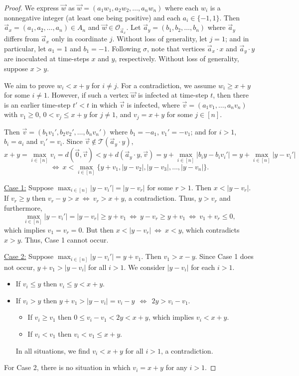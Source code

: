 \documentclass[unknownkeysallowed]{article}
\theoremstyle{definition}\newtheorem{strategy}{Strategy}
\theoremstyle{definition}\newtheorem{notation}{Notation}[theorem]
\begin{document}
\begin{proof} We express $\vec{w}$ 
as $\vec{w} = (a_1w_1,a_2w_2,\dots,a_nw_n)$ where each $w_i$ is a nonnegative integer (at least one being positive) and each $a_i \in \{-1,1\}$.  Then $\vec{a}_x = (a_1,a_2,\dots,a_n) \in A_n$ and 
$\vec{w} \in \mathcal{O}_{\vec{a}_x}$.  Let $\vec{a}_y=(b_1,b_2,\dots,b_n)$ where $\vec{a}_y$ differs from $\vec{a}_x$ only in coordinate $j$.  Without loss of generality, let $j=1$; and in particular, let $a_1=1$ and $b_1=-1$.  Following $\sigma$, note that vertices $\vec{a}_x \cdot x$ and $\vec{a}_y \cdot y$ are inoculated at time-steps $x$ and $y$, respectively.  Without loss of generality, suppose $x > y$.


We aim to prove $w_i < x+y$ for $i \neq j$.  For a contradiction, we  assume $w_i \geq x+y$ for some $i \neq 1$. However, if such a vertex $\vec{w}$ is infected at time-step $t$, then there is an earlier time-step $t'<t$ in which $\vec{v}$ is infected, where $\vec{v}=(a_1v_1,\dots,a_nv_n)$ with $v_1\geq 0$, $0<v_j \leq x+y$ for $j \neq 1$, and $v_j=x+y$ for some $j \in [n]$.
  
Then $\vec{v}= (b_1v_1',b_2v_2',\dots,b_nv_n')$ where $b_1 = -a_1$, $v_1'=-v_1$;  and for $i>1$, $b_i = a_i$ and $v_i'=v_i$.  Since $\vec{v} \not\in \mathcal{T}(\vec{a}_y\cdot y)$,  $$x+y = \max_{i \in [n]} v_i = d(\vec{0},\vec{v})  < y+d(\vec{a}_y \cdot y, \vec{v}) = y+\max_{i \in [n]} |b_iy-b_iv_i'| = y+\max_{i \in [n]} |y-v_i'|$$ $$\Longleftrightarrow~ x < \max_{i \in [n]}\big\{y+v_1,|y-v_2|,|y-v_3|,\dots,|y-v_n|\big\}.$$  

\noindent \underline{Case 1:} Suppose $\max_{i \in [n]} |y-v_i'| = |y-v_r|$ for some $r>1$.  Then $x<|y-v_r|$.  If $v_r \geq y$ then $v_r-y > x ~\Leftrightarrow~ v_r > x+y$, a contradiction.  Thus, $y > v_r$ and furthermore,  $$\max_{i \in [n]} |y-v_i'| = |y-v_r| \geq y+v_1 ~\Longleftrightarrow~ y-v_r \geq y+v_1 ~\Longleftrightarrow~ v_1+v_r \leq 0,$$ which implies $v_1=v_r=0$. But then $x<|y-v_r| ~\Leftrightarrow~ x<y$, which contradicts $x > y$.  Thus, Case 1 cannot occur.  \medskip

\noindent \underline{Case 2:} Suppose $\max_{i \in [n]} |y-v_i'| = y+v_1$.  Then $v_1 > x-y$.  Since Case 1 does not occur, $y+v_1 >  |y-v_i|$ for all $i>1$.  We consider $|y-v_i|$ for each $i>1$. 
\begin{itemize}
\item If $v_i \leq y$ then $v_i \leq y < x+y$.
\item If $v_i > y$ then $y+v_1 > |y-v_i| = v_i - y ~~\Longleftrightarrow~~ 2y > v_i-v_1$. 
\begin{itemize} 
\item If $v_i \geq v_1$ then $0 \leq v_i -v_1 < 2y < x+y$, which implies $v_i < x+y$. 
\item  If $v_i<v_1$ then $v_i < v_1 \leq x+y$.  
\end{itemize}
In all situations, we find $v_i < x+y$ for all $i>1$, a contradiction.
\end{itemize} 
For Case 2, there is no situation in which $v_i = x+y$ for any $i>1$.\medskip


\end{proof}
\end{document}
